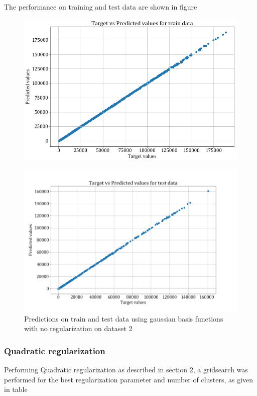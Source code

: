\documentclass[12pt,a4paper]{article}
\begin{document}
The performance on training and test data are shown in figure 
\begin{figure}[H]
    \centering
    \includegraphics[scale = 0.4]{images/train_ds2_noreg.png}
\end{figure}
\begin{figure}[H]
    \centering
    \includegraphics[scale = 0.4]{images/test_ds2_noreg.png}
    \caption{Predictions on train and test data using gaussian basis functions with no regularization on dataset 2}
    \label{fig:train_test_ds2_noreg_gaus}
\end{figure}

\subsubsection{Quadratic regularization}
Performing Quadratic regularization as described in section 2, a gridsearch was performed for the best regularization parameter and number of clusters, as given in table 

\end{document}
